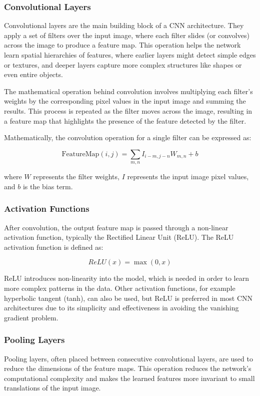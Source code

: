 \subsubsection{Convolutional Layers}

Convolutional layers are the main building block of a CNN architecture. They apply a set of filters over the input image, where each filter slides (or convolves) across the image to produce a feature map. This operation helps the network learn spatial hierarchies of features, where earlier layers might detect simple edges or textures, and deeper layers capture more complex structures like shapes or even entire objects.

The mathematical operation behind convolution involves multiplying each filter's weights by the corresponding pixel values in the input image and summing the results. This process is repeated as the filter moves across the image, resulting in a feature map that highlights the presence of the feature detected by the filter.

Mathematically, the convolution operation for a single filter can be expressed as:

\[
\text{FeatureMap}(i,j) = \sum_{m,n} I_{i-m,j-n} W_{m,n} + b
\]

where \(W\) represents the filter weights, \(I\) represents the input image pixel values, and \(b\) is the bias term.

\subsubsection{Activation Functions}

After convolution, the output feature map is passed through a non-linear activation function, typically the Rectified Linear Unit (ReLU). The ReLU activation function is defined as:

\[
ReLU(x) = \max(0, x)
\]

ReLU introduces non-linearity into the model, which is needed in order to learn more complex patterns in the data. Other activation functions, for example hyperbolic tangent (tanh), can also be used, but ReLU is preferred in most CNN architectures due to its simplicity and effectiveness in avoiding the vanishing gradient problem.

\subsubsection{Pooling Layers}

Pooling layers, often placed between consecutive convolutional layers, are used to reduce the dimensions of the feature maps. This operation reduces the network's computational complexity and makes the learned features more invariant to small translations of the input image.

